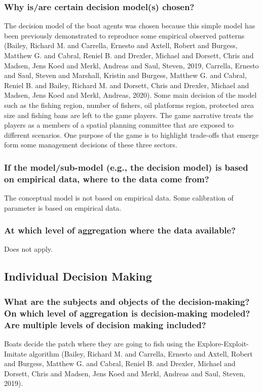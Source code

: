 \documentclass[11pt]{article}
\begin{document}
\subsubsection{Why is/are certain decision model(s) chosen?}
\label{sec:orgacea421}
The decision model of the boat agents was chosen because this simple model has been previously demonstrated to reproduce some empirical observed patterns (Bailey, Richard M. and Carrella, Ernesto and Axtell, Robert and Burgess, Matthew G. and Cabral, Reniel B. and Drexler, Michael and Dorsett, Chris and Madsen, Jens Koed and Merkl, Andreas and Saul, Steven, 2019,  Carrella, Ernesto and Saul, Steven and Marshall, Kristin and Burgess, Matthew G. and Cabral, Reniel B. and Bailey, Richard M. and Dorsett, Chris and Drexler, Michael and Madsen, Jens Koed and Merkl, Andreas, 2020).
Some main decision of the model such as the fishing region, number of fishers, oil platforms region, protected area size and fishing bans are left to the game players. The game narrative treats the players as a members of a spatial planning committee that are exposed to different scenarios. One purpose of the game is to highlight trade-offs that emerge form some management decisions of these three sectors.
\subsubsection{If the model/sub-model (e.g., the decision model) is based on empirical data, where to the data come from?}
\label{sec:orgb6a1bd2}
The conceptual model is not based on empirical data. Some calibration of parameter is based on empirical data.
\subsubsection{At which level of aggregation where the data available?}
\label{sec:org8720dbf}
Does not apply.
\subsection{Individual Decision Making}
\label{sec:orga4cac2c}
\subsubsection{What are the subjects and objects of the decision-making? On which level of aggregation is decision-making modeled? Are multiple levels of decision making included?}
\label{sec:org50524cc}
Boats decide the patch where they are going to fish using the Explore-Exploit-Imitate algorithm (Bailey, Richard M. and Carrella, Ernesto and Axtell, Robert and Burgess, Matthew G. and Cabral, Reniel B. and Drexler, Michael and Dorsett, Chris and Madsen, Jens Koed and Merkl, Andreas and Saul, Steven, 2019).
\end{document}
